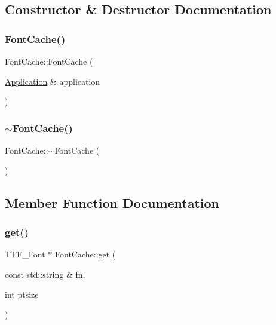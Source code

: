 \subsection{Constructor \& Destructor Documentation}
\mbox{\label{classsage_1_1FontCache_af000fb145e7692fb178bc8bb334fbf16}} 
\subsubsection{\texorpdfstring{FontCache()}{FontCache()}}
{\footnotesize\ttfamily Font\+Cache\+::\+Font\+Cache (\begin{DoxyParamCaption}\item[{\mbox{\hyperlink{classsage_1_1Application}{Application}} \&}]{application }\end{DoxyParamCaption})}

\mbox{\label{classsage_1_1FontCache_a91c4f1c179ae27d846a9f0180ea2e0dc}} 
\subsubsection{\texorpdfstring{$\sim$FontCache()}{~FontCache()}}
{\footnotesize\ttfamily Font\+Cache\+::$\sim$\+Font\+Cache (\begin{DoxyParamCaption}{ }\end{DoxyParamCaption})}



\subsection{Member Function Documentation}
\mbox{\label{classsage_1_1FontCache_a36e3d099603a50bc73a4d8ff6d6bc8dc}} 
\subsubsection{\texorpdfstring{get()}{get()}}
{\footnotesize\ttfamily T\+T\+F\+\_\+\+Font $\ast$ Font\+Cache\+::get (\begin{DoxyParamCaption}\item[{const std\+::string \&}]{fn,  }\item[{int}]{ptsize }\end{DoxyParamCaption})}

